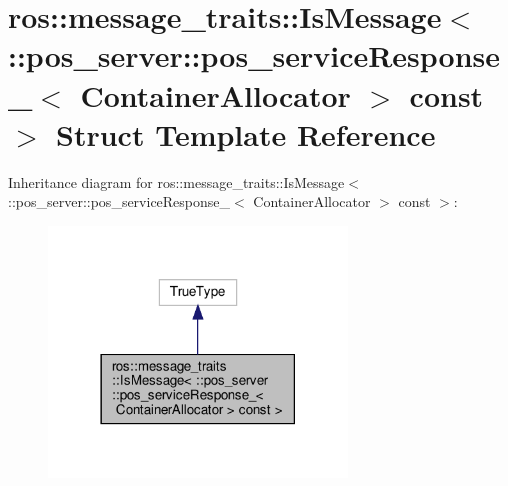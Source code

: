 \hypertarget{structros_1_1message__traits_1_1IsMessage_3_01_1_1pos__server_1_1pos__serviceResponse___3_01Contead0b6704754c0fb8835024c1bbf8f45}{}\section{ros\+:\+:message\+\_\+traits\+:\+:Is\+Message$<$ \+:\+:pos\+\_\+server\+:\+:pos\+\_\+service\+Response\+\_\+$<$ Container\+Allocator $>$ const $>$ Struct Template Reference}
\label{structros_1_1message__traits_1_1IsMessage_3_01_1_1pos__server_1_1pos__serviceResponse___3_01Contead0b6704754c0fb8835024c1bbf8f45}


Inheritance diagram for ros\+:\+:message\+\_\+traits\+:\+:Is\+Message$<$ \+:\+:pos\+\_\+server\+:\+:pos\+\_\+service\+Response\+\_\+$<$ Container\+Allocator $>$ const $>$\+:
\nopagebreak
\begin{figure}[H]
\begin{center}
\leavevmode
\includegraphics[width=225pt]{structros_1_1message__traits_1_1IsMessage_3_01_1_1pos__server_1_1pos__serviceResponse___3_01Cont9a28311198c98a9a751bfd7844c06aca}
\end{center}
\end{figure}


